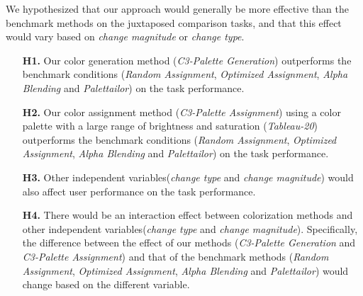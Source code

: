 \vspace{.3em}
 We hypothesized that our approach would generally be more effective than the benchmark methods on the juxtaposed comparison tasks, and that this effect would vary based on \emph{change magnitude} or \emph{change type}.
\begin{itemize}[noitemsep]
\setlength{\itemsep}{5pt}
    \item[\textbf{H1.}] Our color generation method (\emph{C3-Palette Generation}) outperforms the benchmark conditions (\emph{Random Assignment}, \emph{Optimized Assignment}, \emph{Alpha Blending} and \emph{Palettailor}) on the task performance.

    \item [\textbf{H2.}] Our color assignment method (\emph{C3-Palette Assignment}) using a color palette with a large range of brightness and saturation (\emph{Tableau-20}) outperforms the benchmark conditions (\emph{Random Assignment}, \emph{Optimized Assignment}, \emph{Alpha Blending} and \emph{Palettailor}) on the task performance.

    \item [\textbf{H3.}] Other independent variables(\emph{change type} and \emph{change magnitude}) would also affect user performance on the task performance.

    \item [\textbf{H4.}] There would be an interaction effect between colorization methods and other independent variables(\emph{change type} and \emph{change magnitude}). Specifically, the difference between the effect of our methods (\emph{C3-Palette Generation} and \emph{C3-Palette Assignment}) and that of the benchmark methods (\emph{Random Assignment}, \emph{Optimized Assignment}, \emph{Alpha Blending} and \emph{Palettailor}) would change based on the different variable.
\end{itemize}


